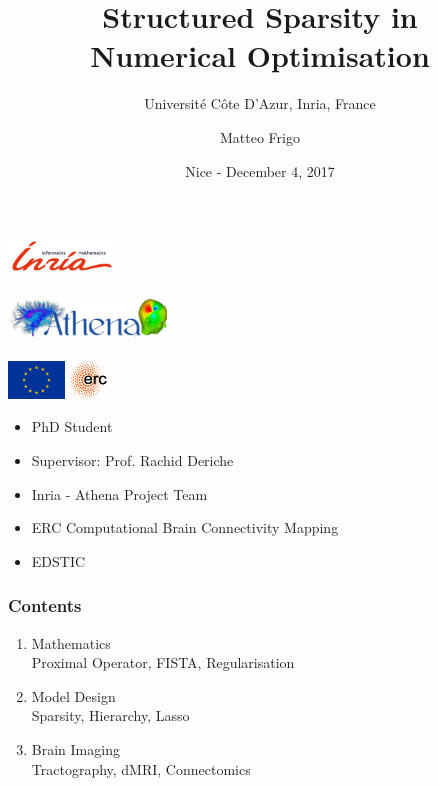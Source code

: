 \documentclass[aspectratio=169]{beamer}
\title{Structured Sparsity in\\Numerical Optimisation}
\subtitle{Universit\'{e} C\^ote D'Azur, Inria, France}
\author{Matteo Frigo}
\date{Nice - December 4, 2017}
\begin{document}
	\setcounter{showProgressBar}{0}
	\setcounter{showSlideNumbers}{0}

	\frame{\titlepage}
	
	\begin{frame}
	\frametitle{}
	\begin{minipage}{.45\textwidth}
	\begin{center}
	\includegraphics[height=1cm,keepaspectratio]{img/logo_inria}\\ \quad \\
	\includegraphics[height=1cm,keepaspectratio]{img/athena-logo}\\ \quad \\
	\includegraphics[height=1cm,keepaspectratio]{img/flag_yellow_high}\qquad
	\includegraphics[height=1cm,keepaspectratio]{img/erc_logo}
	\end{center}
	\end{minipage}
	\quad
	\begin{minipage}{.45\textwidth}
	\begin{itemize}
	\item PhD Student
	\item Supervisor: Prof. Rachid Deriche
	\item Inria - Athena Project Team
	\item ERC Computational Brain Connectivity Mapping 
	\item EDSTIC
	\end{itemize}
	\end{minipage}
	\end{frame}
	
	\begin{frame}
		\frametitle{Contents}
		\begin{enumerate}
			\item Mathematics \\ \textcolor{ExecusharesGrey}{\footnotesize\hspace{1em} Proximal Operator, FISTA, Regularisation}
			\item Model Design  \\ \textcolor{ExecusharesGrey}{\footnotesize\hspace{1em} Sparsity, Hierarchy, Lasso}
			\item Brain Imaging \\ \textcolor{ExecusharesGrey}{\footnotesize\hspace{1em} Tractography, dMRI, Connectomics}
		\end{enumerate}
	\end{frame}
\end{document}

